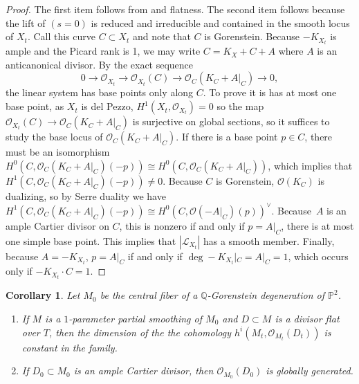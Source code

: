 \documentclass[JEP,XML,SOM,Unicode,NoFloatCountersInSection,published]{cedram}
\theoremstyle{plain}
\newtheorem{corollary}[theorem]{Corollary}
\theoremstyle{definition}
\newcommand\PP{{\mathbb{P}}}
\newcommand\QQ{{\mathbb Q}}
\newcommand\Lc{{\mathcal L}}
\newcommand\Oc{{\mathcal O}}
\begin{document}
\begin{proof}
The first item follows from \cite[Prop.\,2.79]{KollarModuliBook} and flatness. The second item follows because the lift of $(s = 0)$ is reduced and irreducible and contained in the smooth locus of $X_t$. Call this curve $C \subset X_t$ and note that $C$ is Gorenstein. Because $-K_{X_t}$ is ample and the Picard rank is 1, we may write $C = K_X + C + A$ where $A$ is an anticanonical divisor. By the exact sequence
\[ 0 \to \Oc_{X_t} \to \Oc_{X_t}(C) \to \Oc_C(K_C+A|_C) \to 0,\]
the linear system has base points only along $C$. To prove it is has at most one base point, as $X_t$ is del Pezzo, $H^1(X_t, \Oc_{X_t}) = 0$ so the map $\Oc_{X_t}(C) \to \Oc_C(K_C+A|_C)$ is surjective on global sections, so it suffices to study the base locus of $\Oc_C(K_C+A|_C)$. If there is a base point $p \in C$, there must be an isomorphism $H^0(C,\Oc_C(K_C+A|_C)(-p)) \cong H^0(C,\Oc_C(K_C+A|_C))$, which implies that $H^1(C,\Oc_C(K_C+A|_C)(-p)) \ne 0$. Because $C$ is Gorenstein, $\Oc(K_C)$ is dualizing, so by Serre duality we have $H^1(C,\Oc_C(K_C+A|_C)(-p)) \cong H^0(C, \Oc(-A|_C)(p))^\vee$. Because~$A$ is an ample Cartier divisor on $C$, this is nonzero if and only if $p = A|_C$, \ie there is at most one simple base point. This implies that $|\Lc_{X_t}|$ has a smooth member. Finally, because $A = -K_{X_t}$, $p = A|_C $ if and only if $\deg -K_{X_t}|_C = A|_C = 1$, which occurs only if $-K_{X_t} \cdot C = 1$.
\end{proof}

\begin{corollary}\label{cor:ampleisbpfformanetti} Let $M_0$ be the central fiber of a $\QQ$-Gorenstein degeneration of $\PP^2$.
\begin{enumerate}
\item\label{cor:ampleisbpfformanetti1} If $M$ is a $1$-parameter partial smoothing of $M_0$ and $D\subset M$ is a divisor flat over $T$, then the dimension of the the cohomology $h^i(M_t,\Oc_{M_t}(D_t))$ is constant in the family.
\item\label{cor:ampleisbpfformanetti2} If $D_0\subset M_0$ is an ample Cartier divisor, then $\Oc_{M_0}(D_0)$ is globally generated.
\end{enumerate}
\end{corollary}\label{globallygenerated}
\end{document}
